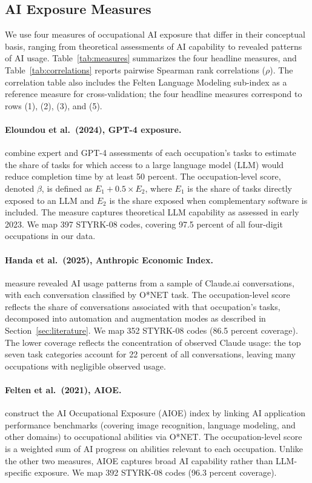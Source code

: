 \subsection{AI Exposure Measures}\label{sec:data:ai}

We use four measures of occupational AI exposure that differ in their conceptual basis, ranging from theoretical assessments of AI capability to revealed patterns of AI usage. Table~\ref{tab:measures} summarizes the four headline measures, and Table~\ref{tab:correlations} reports pairwise Spearman rank correlations ($\rho$). The correlation table also includes the Felten Language Modeling sub-index as a reference measure for cross-validation; the four headline measures correspond to rows (1), (2), (3), and (5).

\paragraph{Eloundou et al.\ (2024), GPT-4 exposure.} \citet{eloundou2024} combine expert and GPT-4 assessments of each occupation's tasks to estimate the share of tasks for which access to a large language model (LLM) would reduce completion time by at least 50 percent. The occupation-level score, denoted $\beta$, is defined as $E_1 + 0.5 \times E_2$, where $E_1$ is the share of tasks directly exposed to an LLM and $E_2$ is the share exposed when complementary software is included. The measure captures theoretical LLM capability as assessed in early 2023. We map 397 STYRK-08 codes, covering 97.5 percent of all four-digit occupations in our data.

\paragraph{Handa et al.\ (2025), Anthropic Economic Index.} \citet{handa2025} measure revealed AI usage patterns from a sample of Claude.ai conversations, with each conversation classified by O*NET task. The occupation-level score reflects the share of conversations associated with that occupation's tasks, decomposed into automation and augmentation modes as described in Section~\ref{sec:literature}. We map 352 STYRK-08 codes (86.5 percent coverage). The lower coverage reflects the concentration of observed Claude usage: the top seven task categories account for 22 percent of all conversations, leaving many occupations with negligible observed usage.

\paragraph{Felten et al.\ (2021), AIOE.} \citet{felten2021} construct the AI Occupational Exposure (AIOE) index by linking AI application performance benchmarks (covering image recognition, language modeling, and other domains) to occupational abilities via O*NET. The occupation-level score is a weighted sum of AI progress on abilities relevant to each occupation. Unlike the other two measures, AIOE captures broad AI capability rather than LLM-specific exposure. We map 392 STYRK-08 codes (96.3 percent coverage).

